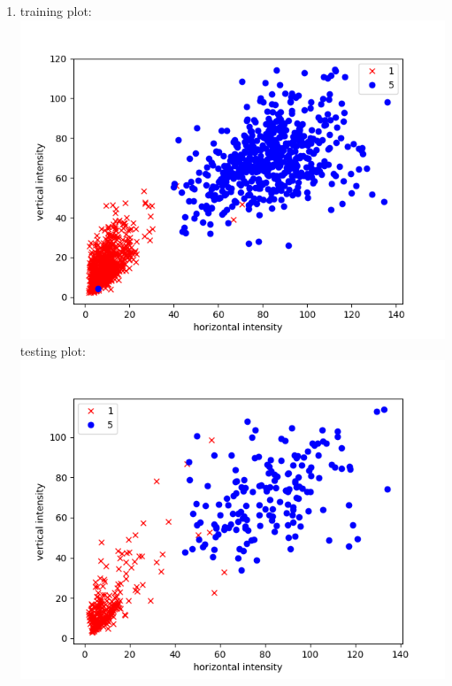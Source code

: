 \documentclass{article}
\begin{document}
\begin{enumerate}
\begin{enumerate}[label=(\alph*)]
            \item training plot: \\ \includegraphics[scale=0.5]{images/handwriting_train.png}\\
            testing plot: \\ \includegraphics[scale=0.5]{images/handwriting_test.png}
        \end{enumerate}
    \end{enumerate}
\end{document}
